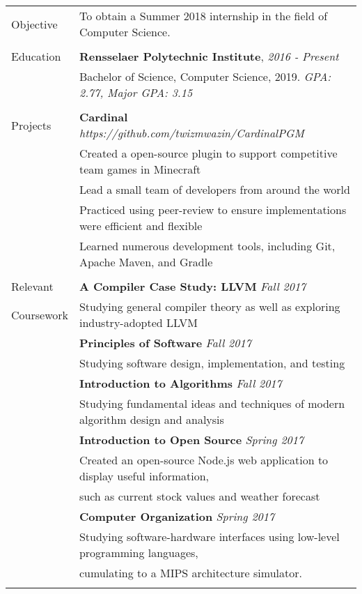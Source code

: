 \documentclass[letterpaper,10pt,oneside]{article}
\begin{document}
\noindent
\begin{tabular}{@{} l l}

  \Large{Objective}
  & To obtain a Summer 2018 internship in the field of Computer Science. \\
  & \\

  \Large{Education}
  & \textbf{Rensselaer Polytechnic Institute}, \textit{2016 - Present} \\
  & Bachelor of Science, Computer Science, 2019. \textit{GPA: 2.77, Major GPA: 3.15} \\
  & \\

  \Large{Projects}
  & \textbf{Cardinal} \textit{https://github.com/twizmwazin/CardinalPGM} \\
  & Created a open-source plugin to support competitive team games in Minecraft \\
  & Lead a small team of developers from around the world \\
  & Practiced using peer-review to ensure implementations were efficient and flexible \\
  & Learned numerous development tools, including Git, Apache Maven, and Gradle \\
  & \\

  \Large{Relevant}
  & \textbf{A Compiler Case Study: LLVM} \textit{Fall 2017} \\
  \Large{Coursework}
  & Studying general compiler theory as well as exploring industry-adopted LLVM \\
  & \textbf{Principles of Software} \textit{Fall 2017} \\
  & Studying software design, implementation, and testing \\
  & \textbf{Introduction to Algorithms} \textit{Fall 2017} \\
  & Studying fundamental ideas and techniques of modern algorithm design and analysis \\
  & \textbf{Introduction to Open Source} \textit{Spring 2017} \\
  & Created an open-source Node.js web application to display useful information, \\
  & such as current stock values and weather forecast \\
  & \textbf{Computer Organization} \textit{Spring 2017} \\
  & Studying software-hardware interfaces using low-level programming languages, \\
  & cumulating to a MIPS architecture simulator. \\
  & \\


\end{tabular}
\end{document}
